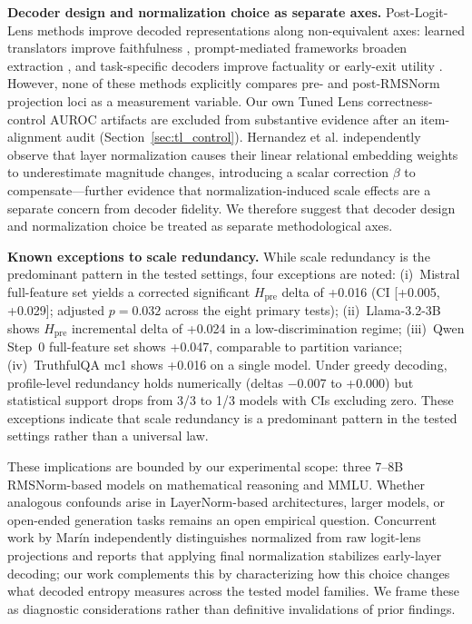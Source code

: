\documentclass{ieeeaccess}
\newcommand{\Hpre}{H_{\text{pre}}}
\begin{document}
\textbf{Decoder design and normalization choice as separate axes.} Post-Logit-Lens methods improve decoded representations along non-equivalent axes: learned translators improve faithfulness \cite{belrose2023tuned, yomdin2024jump}, prompt-mediated frameworks broaden extraction \cite{ghandeharioun2024patchscopes, pal2023futurelens}, and task-specific decoders improve factuality or early-exit utility \cite{chuang2024dola, ma2025simlens}. However, none of these methods explicitly compares pre- and post-RMSNorm projection loci as a measurement variable. Our own Tuned Lens correctness-control AUROC artifacts are excluded from substantive evidence after an item-alignment audit (Section~\ref{sec:tl_control}). Hernandez et al. \cite{hernandez2024linearity} independently observe that layer normalization causes their linear relational embedding weights to underestimate magnitude changes, introducing a scalar correction $\beta$ to compensate---further evidence that normalization-induced scale effects are a separate concern from decoder fidelity. We therefore suggest that decoder design and normalization choice be treated as separate methodological axes.

\textbf{Known exceptions to scale redundancy.} While scale redundancy is the predominant pattern in the tested settings, four exceptions are noted: (i)~Mistral full-feature set yields a corrected significant $\Hpre$ delta of +0.016 (CI [+0.005, +0.029]; adjusted $p=0.032$ across the eight primary tests); (ii)~Llama-3.2-3B shows $\Hpre$ incremental delta of +0.024 in a low-discrimination regime; (iii)~Qwen Step~0 full-feature set shows +0.047, comparable to partition variance; (iv)~TruthfulQA mc1 shows +0.016 on a single model. Under greedy decoding, profile-level redundancy holds numerically (deltas $-$0.007 to +0.000) but statistical support drops from 3/3 to 1/3 models with CIs excluding zero. These exceptions indicate that scale redundancy is a predominant pattern in the tested settings rather than a universal law.

These implications are bounded by our experimental scope: three 7--8B RMSNorm-based models on mathematical reasoning and MMLU. Whether analogous confounds arise in LayerNorm-based architectures, larger models, or open-ended generation tasks remains an open empirical question. Concurrent work by Mar\'in \cite{marin2026rotational} independently distinguishes normalized from raw logit-lens projections and reports that applying final normalization stabilizes early-layer decoding; our work complements this by characterizing how this choice changes what decoded entropy measures across the tested model families. We frame these as diagnostic considerations rather than definitive invalidations of prior findings.
\end{document}
